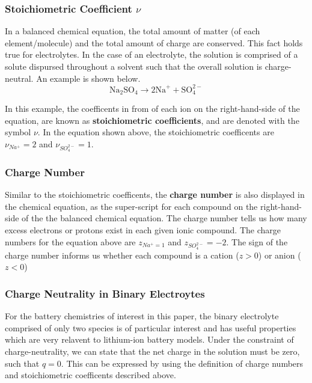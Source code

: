 \documentclass[lettersize,journal]{IEEEtran}
\begin{document}
\subsubsection{ Stoichiometric Coefficient $\nu$}
In a balanced chemical equation, the total amount of matter (of each element/molecule) and the total amount of charge are conserved. This fact holds true for electrolytes. In the case of an electrolyte, the solution is comprised of a solute dispursed throughout a solvent such that the overall solution is charge-neutral. An example is shown below.
\begin{equation}
  \mathrm{Na}_{2} \mathrm{SO}_{4} \rightarrow 2 \mathrm{Na}^{+}+\mathrm{SO}_{4}^{2-}
\end{equation}

In this example, the coefficents in from of each ion on the right-hand-side of the equation, are known as \textbf{stoichiometric coefficients}, and are denoted with the symbol $\nu$. In the equation shown above, the stoichiometric coefficents are $\nu_{Na^{+}} = 2$ and $\nu_{SO_{4}^{2-}} = 1$. \\

\subsubsection{ Charge Number}

Similar to the stoichiometric coefficents, the \textbf{charge number} is also displayed in the chemical equation, as the super-script for each compound on the right-hand-side of the the balanced chemical equation. The charge number tells us how many excess electrons or protons exist in each given ionic compound. The charge numbers for the equation above are $z_{Na^{+} = 1}$ and $ z_{SO_{4}^{2-}} = -2 $. The sign of the charge number informs us whether each compound is a cation ($z>0$) or anion ($z < 0 $) \\

\subsubsection{ Charge Neutrality in Binary Electroytes }
For the battery chemistries of interest in this paper, the binary electrolyte comprised of only two species is of particular interest and has useful properties which are very relavent to lithium-ion battery models. Under the constraint of charge-neutrality, we can state that the net charge in the solution must be zero, such that $q = 0$. This can be expressed by using the definition of charge numbers and stoichiometric coefficents described above.
\end{document}
